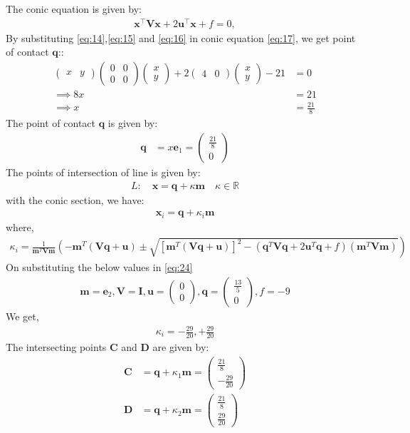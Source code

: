 \documentclass[12pt]{article}
\newcommand{\myvec}[1]{\ensuremath{\begin{pmatrix}#1\end{pmatrix}}}
\let\vec\mathbf
\let\vec\mathbf
\providecommand{\brak}[1]{\ensuremath{\left(#1\right)}}
\providecommand{\lbrak}[1]{\ensuremath{\left(#1\right.}}
\providecommand{\rbrak}[1]{\ensuremath{\left.#1\right)}}
\providecommand{\sbrak}[1]{\ensuremath{{}\left[#1\right]}}
\providecommand{\brak}[1]{\ensuremath{\left(#1\right)}}
\let\vec\mathbf
\begin{document}
The conic equation is given by:
 \begin{align}
 \vec{x}^\top\vec{V}\vec{x}+2\vec{u}^\top\vec{x}+f=0, 
  \label{eq:17}
 \end{align}
By substituting \eqref{eq:14},\eqref{eq:15} and \eqref{eq:16} in conic equation \eqref{eq:17}, we get point of contact $\vec{q}$::
\begin{align}
	\myvec{x&y}\myvec{0&0\\0&0}\myvec{x\\y}+2\myvec{4&0}\myvec{x\\y}-21&=0\\
\implies	8x&=21\\
\implies	x&=\frac{21}{8}
\end{align}
	The point of contact $\vec{q}$ is given by:
	\begin{align}
	\vec{q}&=x\vec{e}_1=\myvec{\frac{21}{8}\\[2pt]0}
\end{align}
The points of intersection of line is given by: 
\begin{align}
L: \quad \vec{x} = \vec{q} + \kappa \vec{m} \quad \kappa \in \mathbb{R}
\end{align}
with the conic section, we have:
 \begin{align}
 \vec{x}_i = \vec{q} + \kappa_i \vec{m}
 \end{align}
 where, 
\begin{align}
\kappa_i = \frac{1}
{\vec{m}^T\vec{V}\vec{m}}
\lbrak{-\vec{m}^T\brak{\vec{V}\vec{q}+\vec{u}}}
\pm
\rbrak{\sqrt{
\sbrak{
\vec{m}^T\brak{\vec{V}\vec{q}+\vec{u}}
}^2
-
\brak
{
\vec{q}^T\vec{V}\vec{q} + 2\vec{u}^T\vec{q} +f
}
\brak{\vec{m}^T\vec{V}\vec{m}}
}
}
\label{eq:24}
\end{align}
On substituting the below values in \eqref{eq:24}
\begin{align}
 \vec{m}=\vec{e}_2,\vec{V}=\vec{I},\vec{u}=\myvec{0\\0},\vec{q}=\myvec{\frac{13}{5}\\[2pt]0},f=-9
\end{align}
We get,
\begin{align}
\kappa_i=-\frac{29}{20},+\frac{29}{20}
\end{align}
The intersecting points $\vec{C}$ and $\vec{D}$ are given by:
\begin{align}
    \vec{C}&=\vec{q}+\kappa_1\vec{m}=\myvec{\frac{21}{8}\\[2pt]-\frac{29}{20}}\\
    \vec{D}&=\vec{q}+\kappa_2\vec{m}=\myvec{\frac{21}{8}\\[2pt]\frac{29}{20}}
\end{align}
\end{document}

